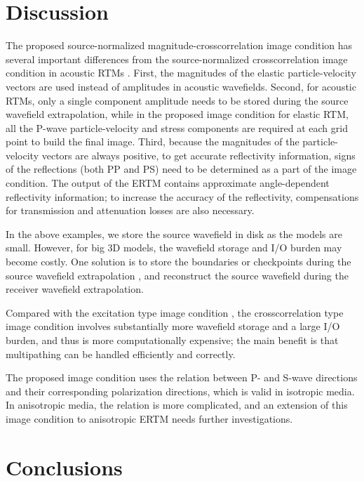 \documentclass[manuscript,ulem,graphix,revised]{geophysics}
\begin{document}
\section{Discussion}

The proposed source-normalized magnitude-crosscorrelation image condition has several important differences from the source-normalized crosscorrelation image condition in acoustic RTMs \citep{kaelin06}. First, the magnitudes of the elastic particle-velocity vectors are used instead of amplitudes in acoustic wavefields. Second, for acoustic RTMs, only a single component amplitude needs to be stored during the source wavefield extrapolation, while in the proposed image condition for elastic RTM, all the P-wave particle-velocity and stress components are required at each grid point to build the final image. Third, because the magnitudes of the particle-velocity vectors are always positive, to get accurate reflectivity information, signs of the reflections (both PP and PS) need to be determined as a part of the image condition. The output of the ERTM contains approximate angle-dependent reflectivity information; to increase the accuracy of the reflectivity, compensations for transmission and attenuation losses \citep{deng07,deng08} are also necessary.

In the above examples, we store the source wavefield in disk as the models are small. However, for big 3D models, the wavefield storage and I/O burden may become costly. One solution is to store the boundaries or checkpoints during the source wavefield extrapolation \citep{bao15}, and reconstruct the source wavefield during the receiver wavefield extrapolation.

Compared with the excitation type image condition \citep{wenlong_vct15,wenlong_3d16}, the crosscorrelation type image condition involves substantially more wavefield storage and a large I/O burden, and thus is more computationally expensive; the main benefit is that multipathing can be handled efficiently and correctly.

The proposed image condition uses the relation between P- and S-wave directions and their corresponding polarization directions, which is valid in isotropic media. In anisotropic media, the relation is more complicated, and an extension of this image condition to anisotropic ERTM needs further investigations.


\section{Conclusions}
\end{document}
